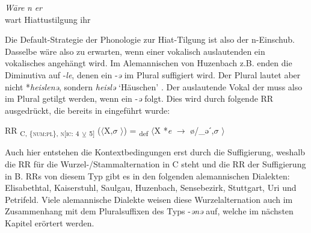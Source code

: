 \ea%
    \label{ex:key:58}
\gll \textit{W\=are} \hspace{2em} \textit{n} \hspace{2em} \textit{er}\\
wart {} Hiattustilgung {} ihr\\

\citep[321]{Noth1993}
\z

Die Default-Strategie der Phonologie zur Hiat-Tilgung ist also der n-Einschub. Dasselbe wäre also zu erwarten, wenn einer vokalisch auslautenden  ein vokalisches  angehängt wird. Im Alemannischen von Huzenbach z.B. enden die Diminutiva auf -\textit{le}, denen ein -\textit{ə} im Plural suffigiert wird. Der Plural lautet aber nicht *\textit{heislenə}, sondern \textit{heislə} ‘Häuschen’ \citep[98]{Baur1967}. Der auslautende Vokal der  muss also im Plural getilgt werden, wenn ein -\textit{ə} folgt. Dies wird durch folgende RR ausgedrückt, die bereits in  eingeführt wurde:

\begin{exe}
 RR \textsubscript{C, \{\textsc{num:pl}\}, \textsc{n[}\textsc{ic:} 4} \textsubscript{\tiny $\veebar$} \textsubscript{5]} ($\langle$X,$\sigma$ $\rangle$) = \textsubscript{def} $\langle$X *\textit{e} $\rightarrow$ ø/\_əˊ,$\sigma$ $\rangle$
\end{exe}

Auch hier entstehen die Kontextbedingungen erst durch die Suffigierung, weshalb die RR für die Wur\-zel-/Stamm\-al\-ter\-na\-tion in  C steht und die RR der Suffigierung in  B. RRs von diesem Typ gibt es in den folgenden alemannischen Dialekten: Elisabethtal, Kaiserstuhl, Saulgau, Huzenbach, Sensebezirk, Stuttgart, Uri und Petrifeld. Viele alemannische Dialekte weisen diese Wurzelalternation auch im Zusammenhang mit dem Pluralsuffixen des Typs -\textit{ənə} auf, welche im nächsten Kapitel erörtert werden.

